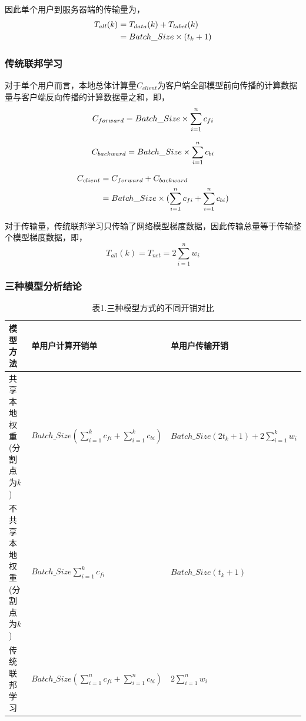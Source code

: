 \documentclass{article}
\begin{document}
因此单个⽤户到服务器端的传输量为，
\begin{align}
    T_{all}(k) & = T_{data}(k)+T_{label}(k) \notag\\
    & = Batch\_Size \times (t_k+1)
\end{align}

\subsubsection{传统联邦学习}
对于单个⽤户⽽⾔，本地总体计算量$C_{client}$为客户端全部模型前向传播的计算数据量与客户端反向传播的计算数据量之和，即，
\begin{equation}
    \centering
    C_{forward}=Batch\_Size\times \sum_{i=1}^n c_{fi}
\end{equation}

\begin{equation}
    \centering
    C_{backward}=Batch\_Size\times \sum_{i=1}^n c_{bi}
\end{equation}

\begin{align}
    C_{client} & =C_{forward}+C_{backward} \notag\\
    & = Batch\_Size \times (\sum_{i=1}^n c_{fi}+\sum_{i=1}^n c_{bi})
\end{align}


对于传输量，传统联邦学习只传输了网络模型梯度数据，因此传输总量等于传输整个模型梯度数据，即，
\begin{equation}
    T_{all}(k)=T_{net}=2\sum_{i=1}^n w_i    
\end{equation}

\subsubsection{三种模型分析结论}

\begin{table}[H]
    \caption*{表1.三种模型方式的不同开销对比}
    \centering
    \begin{tabular}{lll}
    \toprule
    模型方法 & 单⽤户计算开销单 & 单⽤户传输开销\\
    \midrule
    共享本地权重(分割点为$k$) & $Batch\_Size(\sum_{i=1}^k c_{fi}+\sum_{i=1}^k c_{bi})$ & $Batch\_Size(2t_k+1)+2\sum_{i=1}^k w_i$\\
    不共享本地权重(分割点为$k$) & $Batch\_Size \sum_{i=1}^k c_{fi}$ & $Batch\_Size (t_k+1)$\\
    传统联邦学习 & $Batch\_Size (\sum_{i=1}^n c_{fi}+\sum_{i=1}^n c_{bi})$ & $2\sum_{i=1}^n w_i$\\
    \bottomrule
    \end{tabular}
\end{table}
\end{document}
